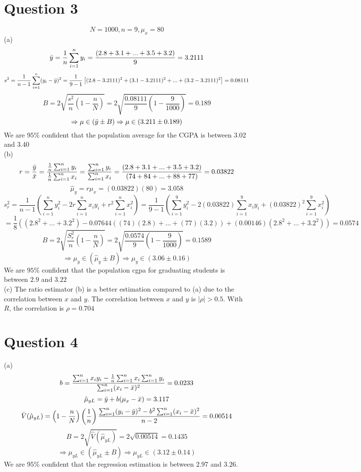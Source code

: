 \documentclass[11pt]{article}
\theoremstyle{claim}
\begin{document}
\section*{Question 3}
\[N=1000, n=9, \mu_x=80\]
(a)
\[\Bar{y}=\frac{1}{n}\sum^n_{i=1}y_i=\frac{(2.8+3.1+...+3.5+3.2)}{9}=3.2111\]
\[s^2=\frac{1}{n-1}\sum^n_{i=1}(y_i-\Bar{y})^2=\frac{1}{9-1}\left[(2.8-3.2111)^2+(3.1-3.2111)^2+...+(3.2-3.2111)^2\right]=0.08111\]
\[B=2\sqrt{\frac{s^2}{n}\left(1-\frac{n}{N}\right)}=2\sqrt{\frac{0.08111}{9}\left(1-\frac{9}{1000}\right)}=0.189\]
\[\Rightarrow \mu \in (\Bar{y}\pm B) \Rightarrow \mu \in (3.211\pm 0.189)\]
We are $95\%$ confident that the population average for the CGPA is between 3.02 and 3.40
\vspace{5mm}
\\(b)
\[r=\frac{\Bar{y}}{\Bar{x}}
=\frac{\frac{1}{n}\sum^n_{i=1}y_i}{\frac{1}{n}\sum^n_{i=1}x_i}
=\frac{\sum^n_{i=1}y_i}{\sum^n_{i=1}x_i}=\frac{(2.8+3.1+...+3.5+3.2)}{(74+84+...+88+77)}=0.03822\]
\[\hat{\mu}_y=r\mu_x=(0.03822)(80)=3.058\]
\[s^2_r=\frac{1}{n-1}\left(\sum^n_{i=1}y_i^2-2r\sum^n_{i=1}x_iy_i+r^2\sum^n_{i=1}x_i^2\right)=\frac{1}{9-1}\left(\sum^9_{i=1}y_i^2-2(0.03822)\sum^9_{i=1}x_iy_i+(0.03822)^2\sum^9_{i=1}x_i^2\right)\]
\[=\frac{1}{8}\left((2.8^2+...+3.2^2)-0.07644((74)(2.8)+...+(77)(3.2))+(0.00146)(2.8^2+...+3.2^2)\right)=0.0574\]
\[B=2\sqrt{\frac{S^2_r}{n}\left(1-\frac{n}{N}\right)}=2\sqrt{\frac{0.0574}{9}\left(1-\frac{9}{1000}\right)}=0.1589\]
\[\Rightarrow \mu_y \in (\hat{\mu}_y\pm B) \Rightarrow \mu_y \in (3.06\pm 0.16)\]
We are $95\%$ confident that the population cgpa for graduating students is between $2.9$ and $3.22$
\vspace{5mm}
\\(c)
The ratio estimator (b) is a better estimation compared to (a) due to the correlation between $x$ and $y$. The correlation between $x$ and $y$ is $|\rho|>0.5$. With $R$, the correlation is $\rho=0.704$
\newpage
\section*{Question 4}
(a)
\[b=\frac{\sum^n_{i=1}x_iy_i-\frac{1}{n}\sum^n_{i=1}x_i\sum^n_{i=1}y_i}{\sum^n_{i=1}(x_i-\Bar{x})^2}=0.0233\]
\[\hat{\mu}_{yL}=\Bar{y}+b(\mu_x-\Bar{x})=3.117\]
\[\hat{V}(\hat{\mu}_{yL})=\left(1-\frac{n}{N}\right)\left(\frac{1}{n}\right)\frac{\sum^n_{i=1}(y_i-\Bar{y})^2-b^2\sum^n_{i=1}(x_i-\Bar{x})^2}{n-2}=0.00514\]
\[B=2\sqrt{\hat{V}(\hat{\mu}_{yL})}=2\sqrt{0.00514}=0.1435\]
\[\Rightarrow \mu_{yL}\in(\hat{\mu}_{yL}\pm B) \Rightarrow \mu_{yL}\in(3.12\pm 0.14)\]
We are $95\%$ confident that the regression estimation is between $2.97$ and $3.26$.
\end{document}

